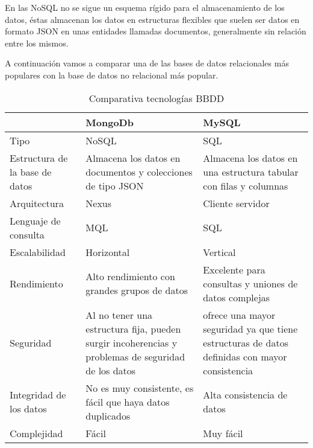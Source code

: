 En las NoSQL no se sigue un esquema rígido para el almacenamiento de los datos, éstas almacenan los datos en estructuras flexibles que suelen ser datos en formato JSON en unas entidades llamadas documentos, generalmente sin relación entre los mismos.\cite{sqlvsno}

A continuación vamos a comparar una de las bases de datos relacionales más populares con la base de datos no relacional más popular. 

\begin{table}[H] %
    \centering
    \begin{tabular}{|p{2cm} |p{4 cm} |p{4cm} |} \hline 
         &  \textbf{MongoDb}&  \textbf{MySQL}\\  \hline 
         Tipo &  NoSQL &  SQL \\ \hline 
         
        Estructura de la base de datos &  Almacena los datos en documentos y colecciones de tipo JSON &  Almacena los datos en una estructura tabular con filas y columnas \\ \hline 
        Arquitectura &  Nexus &  Cliente servidor\\ \hline 
        Lenguaje de consulta &  MQL &  SQL\\ \hline
        Escalabilidad & Horizontal & Vertical \\ \hline
        Rendimiento & Alto rendimiento con grandes grupos de datos & Excelente para consultas y uniones de datos complejas \\ \hline 
        Seguridad &  Al no tener una estructura fija, pueden surgir incoherencias y problemas de seguridad de los datos &  ofrece una mayor seguridad ya que tiene estructuras de datos definidas con mayor consistencia \\ \hline
      	Integridad de los datos & No es muy consistente, es fácil que haya datos duplicados & Alta consistencia de datos \\ \hline
        Complejidad &  Fácil &  Muy fácil \\ \hline
        
    \end{tabular}
    \caption{Comparativa tecnologías BBDD \cite{sqlcomparison}}
    \label{tab:tec_db}
\end{table}


